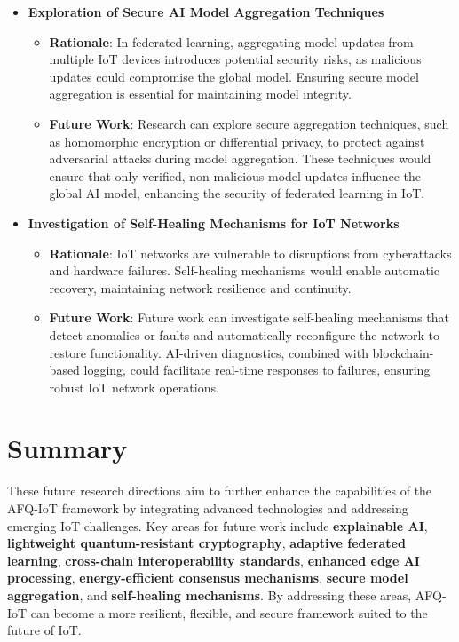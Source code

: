 \documentclass[12pt, oneside]{report}
\begin{document}
\begin{itemize}
    \item \textbf{Exploration of Secure AI Model Aggregation Techniques}
    \begin{itemize}
        \item \textbf{Rationale}: In federated learning, aggregating model updates from multiple IoT devices introduces potential security risks, as malicious updates could compromise the global model. Ensuring secure model aggregation is essential for maintaining model integrity.
        \item \textbf{Future Work}: Research can explore secure aggregation techniques, such as homomorphic encryption or differential privacy, to protect against adversarial attacks during model aggregation. These techniques would ensure that only verified, non-malicious model updates influence the global AI model, enhancing the security of federated learning in IoT.
    \end{itemize}

    \item \textbf{Investigation of Self-Healing Mechanisms for IoT Networks}
    \begin{itemize}
        \item \textbf{Rationale}: IoT networks are vulnerable to disruptions from cyberattacks and hardware failures. Self-healing mechanisms would enable automatic recovery, maintaining network resilience and continuity.
        \item \textbf{Future Work}: Future work can investigate self-healing mechanisms that detect anomalies or faults and automatically reconfigure the network to restore functionality. AI-driven diagnostics, combined with blockchain-based logging, could facilitate real-time responses to failures, ensuring robust IoT network operations.
    \end{itemize}

\end{itemize}

\section*{Summary}

These future research directions aim to further enhance the capabilities of the AFQ-IoT framework by integrating advanced technologies and addressing emerging IoT challenges. Key areas for future work include \textbf{explainable AI}, \textbf{lightweight quantum-resistant cryptography}, \textbf{adaptive federated learning}, \textbf{cross-chain interoperability standards}, \textbf{enhanced edge AI processing}, \textbf{energy-efficient consensus mechanisms}, \textbf{secure model aggregation}, and \textbf{self-healing mechanisms}. By addressing these areas, AFQ-IoT can become a more resilient, flexible, and secure framework suited to the future of IoT.
\end{document}
